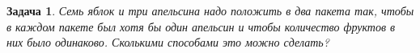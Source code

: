 \documentclass[12pt, a4paper]{article}
\newtheorem{problem}{Задача}
\begin{document}
\begin{problem}
Семь яблок и три апельсина надо положить в два пакета так, чтобы в каждом пакете был хотя бы один апельсин и чтобы количество фруктов в них было одинаково. Сколькими способами это можно сделать? 
\begin{sol}

\end{sol}
\end{problem}




% 
\end{document}
